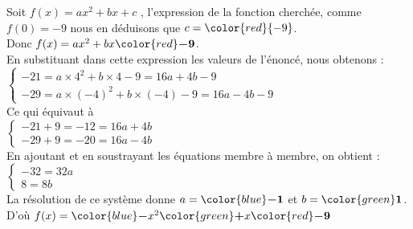 \documentclass[a4paper,11pt,exos]{nsi} %
\begin{document}
Soit $f(x)=ax^{2}+bx+c$ , l'expression de la fonction cherchée,
			comme $f(0)=-9$ nous en déduisons que
			$c={\color{red}{-9}}$.\\Donc $f(x)=ax^{2}+bx{\color{red}\boldsymbol{-9}}$.\\En
			substituant dans cette expression les valeurs de l'énoncé, nous obtenons :\\$\begin{cases}
				-21=a\times4^{2}+b\times4-9=16a +4b -9       \\
				-29=a\times(-4)^{2}+b\times(-4)-9=16a -4b -9
			\end{cases}$\\Ce qui équivaut à \\$\begin{cases}
				-21+9=-12=16a +4b \\
				-29+9=-20=16a -4b
			\end{cases}$\\En ajoutant et en soustrayant les équations membre à membre,
			on obtient :\\ $\begin{cases}
				-32=32a \\
				8=8b
			\end{cases}$\\La résolution de ce système donne
			$a={\color{blue}\boldsymbol{-1}}$ et $b={\color{green}\boldsymbol{1}}$.\\D'où
			$f(x)={\color{blue}\boldsymbol{-}}x^{2}{\color{green}\boldsymbol{+}}
			x{\color{red}\boldsymbol{-9}}$\\
\end{document}
